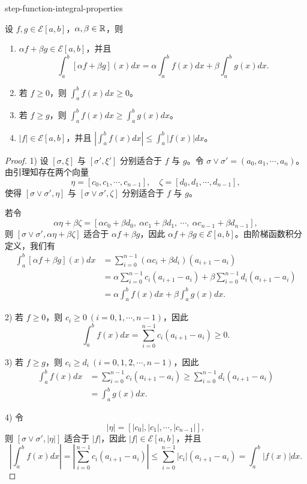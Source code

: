 \begin{mythm}{}{step-function-integral-properties}

	设 \(f,g\in\mathscr{E}[a,b]\)，\(\alpha,\beta\in\mathbb{R}\)，则

	\begin{enumerate}[label=\arabic*)]
		\item \(\alpha f+\beta g\in\mathscr{E}[a,b]\)，并且
		\[
		\int_a^b[\alpha f+\beta g](x)dx=\alpha\int_a^b f(x)dx+\beta\int_a^b g(x)dx.
		\]

		\item 若 \(f\ge0\)，则 \(\displaystyle\int_a^b f(x)dx\ge0\)。

		\item 若 \(f\ge g\)，则 \(\displaystyle\int_a^b f(x)dx\ge\int_a^b g(x)dx\)。

		\item \(|f|\in\mathscr{E}[a,b]\)，并且 \(\displaystyle\left|\int_a^b f(x)dx\right|\le\int_a^b|f(x)|dx\)。
	\end{enumerate}

\end{mythm}

\begin{proof}

	1) 设 \([\sigma,\xi]\) 与 \([\sigma',\xi']\) 分别适合于 \(f\) 与 \(g\)。令 \(\sigma\vee\sigma'=(a_0,a_1,\cdots,a_n)\)。由引理知存在两个向量
	\[
	\eta=[c_0,c_1,\cdots,c_{n-1}],\quad \zeta=[d_0,d_1,\cdots,d_{n-1}],
	\]
	使得 \([\sigma\vee\sigma',\eta]\) 与 \([\sigma\vee\sigma',\zeta]\) 分别适合于 \(f\) 与 \(g\)。

	若令
	\[
	\alpha\eta+\beta\zeta=[\alpha c_0+\beta d_0,\ \alpha c_1+\beta d_1,\ \cdots,\ \alpha c_{n-1}+\beta d_{n-1}],
	\]
	则 \([\sigma\vee\sigma',\alpha\eta+\beta\zeta]\) 适合于 \(\alpha f+\beta g\)，因此 \(\alpha f+\beta g\in\mathscr{E}[a,b]\)。由阶梯函数积分定义，我们有
	\[
	\begin{aligned}
	\int_a^b[\alpha f+\beta g](x)dx
	&=\sum_{i=0}^{n-1}(\alpha c_i+\beta d_i)(a_{i+1}-a_i)\\
	&=\alpha\sum_{i=0}^{n-1}c_i(a_{i+1}-a_i)+\beta\sum_{i=0}^{n-1}d_i(a_{i+1}-a_i)\\
	&=\alpha\int_a^b f(x)dx+\beta\int_a^b g(x)dx.
	\end{aligned}
	\]

	2) 若 \(f\ge0\)，则 \(c_i\ge0\ (i=0,1,\cdots,n-1)\)，因此
	\[
	\int_a^b f(x)dx=\sum_{i=0}^{n-1}c_i(a_{i+1}-a_i)\ge0.
	\]

	3) 若 \(f\ge g\)，则 \(c_i\ge d_i\ (i=0,1,2,\cdots,n-1)\)，因此
	\[
	\begin{aligned}
	\int_a^b f(x)dx
	&=\sum_{i=0}^{n-1}c_i(a_{i+1}-a_i)\ge\sum_{i=0}^{n-1}d_i(a_{i+1}-a_i)\\
	&=\int_a^b g(x)dx.
	\end{aligned}
	\]

	4) 令
	\[
	|\eta|=[|c_0|,|c_1|,\cdots,|c_{n-1}|],
	\]
	则 \([\sigma\vee\sigma',|\eta|]\) 适合于 \(|f|\)，因此 \(|f|\in\mathscr{E}[a,b]\)，并且
	\[
	\left|\int_a^b f(x)dx\right|=\left|\sum_{i=0}^{n-1}c_i(a_{i+1}-a_i)\right|\le\sum_{i=0}^{n-1}|c_i|(a_{i+1}-a_i)=\int_a^b|f(x)|dx.
	\]

\end{proof}

